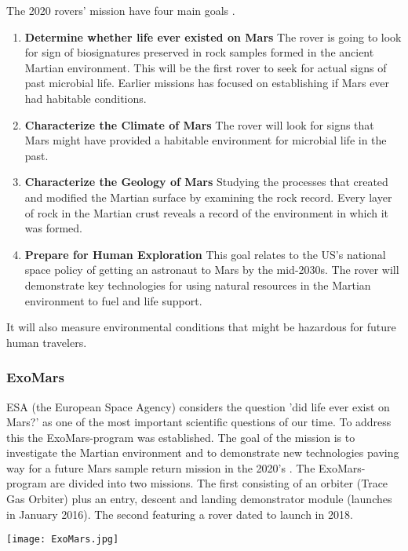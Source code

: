 The 2020 rovers’ mission have four main goals \cite{FPlan13}.

\begin{enumerate}
	\item \textbf{Determine whether life ever existed on Mars}
The rover is going to look for sign of biosignatures preserved in rock samples formed in the ancient Martian environment.
This will be the first rover to seek for actual signs of past microbial life.
Earlier missions has focused on establishing if Mars ever had habitable conditions.
	\item \textbf{Characterize the Climate of Mars}
The rover will look for signs that Mars might have provided a habitable environment for microbial life in the past.
	\item \textbf{Characterize the Geology of Mars}
Studying the processes that created and modified the Martian surface by examining the rock record.
Every layer of rock in the Martian crust reveals a record of the environment in which it was formed.
	\item \textbf{Prepare for Human Exploration}
This goal relates to the US’s national space policy of getting an astronaut to Mars by the mid-2030s.
The rover will demonstrate key technologies for using natural resources in the Martian environment to fuel and life support.
\end{enumerate}

It will also measure environmental conditions that might be hazardous for future human travelers. 

\subsubsection*{ExoMars}

ESA (the European Space Agency) considers the question 'did life ever exist on Mars?' as one of the most important scientific questions of our time.
To address this the ExoMars-program was established.
The goal of the mission is to investigate the Martian environment and to demonstrate new technologies paving way for a future Mars sample return mission in the 2020’s \cite{FPlan02}. 
The ExoMars-program are divided into two missions.
The first consisting of an orbiter (Trace Gas Orbiter) plus an entry, descent and landing demonstrator module (launches in January 2016).
The second featuring a rover dated to launch in 2018.
 
\begin{center}
	\texttt{[image: ExoMars.jpg]}
\end{center}

